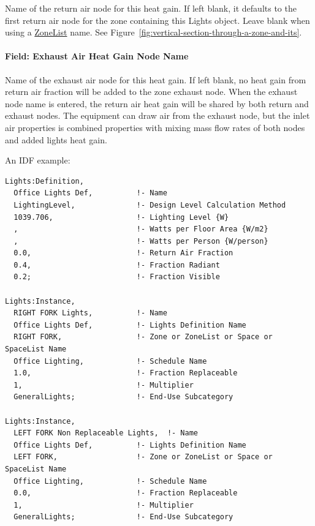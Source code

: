 Name of the return air node for this heat gain. If left blank, it defaults to the first return air node for the zone containing this Lights object. Leave blank when using a \hyperref[zonelist]{ZoneList} name. See Figure~\ref{fig:vertical-section-through-a-zone-and-its}.

\paragraph{Field: Exhaust Air Heat Gain Node Name}\label{field-exhaust-air-heat-gain-node-name-lights-instance}

Name of the exhaust air node for this heat gain. If left blank, no heat gain from return air fraction will be added to the zone exhaust node. When the exhaust node name is entered, the return air heat gain will be shared by both return and exhaust nodes. The equipment can draw air from the exhaust node, but the inlet air properties is combined properties with mixing mass flow rates of both nodes and added lights heat gain.

An IDF example:

\begin{lstlisting}
Lights:Definition,
  Office Lights Def,          !- Name
  LightingLevel,              !- Design Level Calculation Method
  1039.706,                   !- Lighting Level {W}
  ,                           !- Watts per Floor Area {W/m2}
  ,                           !- Watts per Person {W/person}
  0.0,                        !- Return Air Fraction
  0.4,                        !- Fraction Radiant
  0.2;                        !- Fraction Visible

Lights:Instance,
  RIGHT FORK Lights,          !- Name
  Office Lights Def,          !- Lights Definition Name
  RIGHT FORK,                 !- Zone or ZoneList or Space or SpaceList Name
  Office Lighting,            !- Schedule Name
  1.0,                        !- Fraction Replaceable
  1,                          !- Multiplier
  GeneralLights;              !- End-Use Subcategory

Lights:Instance,
  LEFT FORK Non Replaceable Lights,  !- Name
  Office Lights Def,          !- Lights Definition Name
  LEFT FORK,                  !- Zone or ZoneList or Space or SpaceList Name
  Office Lighting,            !- Schedule Name
  0.0,                        !- Fraction Replaceable
  1,                          !- Multiplier
  GeneralLights;              !- End-Use Subcategory
\end{lstlisting}


